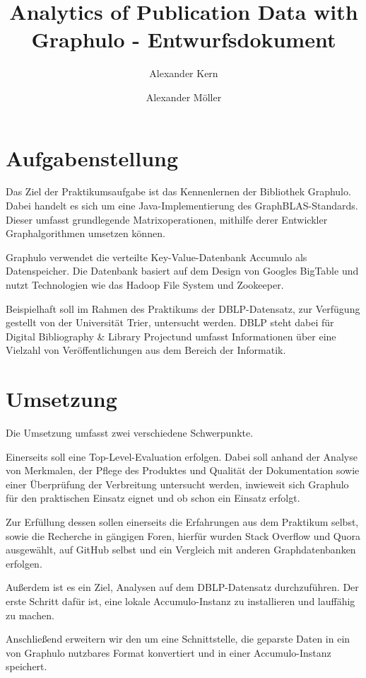 \documentclass{article}
\title{Analytics of Publication Data with Graphulo - Entwurfsdokument}
\author{Alexander Kern \and Alexander Möller}
\begin{document}
\maketitle
	
\section{Aufgabenstellung}

Das Ziel der Praktikumsaufgabe ist das Kennenlernen der Bibliothek Graphulo. Dabei handelt es sich um eine Java-Implementierung des GraphBLAS-Standards. Dieser umfasst grundlegende Matrixoperationen, mithilfe derer Entwickler Graphalgorithmen umsetzen können. \cite{graph}

Graphulo verwendet die verteilte Key-Value-Datenbank Accumulo als Datenspeicher. Die Datenbank basiert auf dem Design von Googles BigTable und nutzt Technologien wie das Hadoop File System und Zookeeper. \cite{acc} 

Beispielhaft soll im Rahmen des Praktikums der DBLP-Datensatz, zur Verfügung gestellt von der Universität Trier, untersucht werden. DBLP steht dabei für \glqq Digital Bibliography \& Library Project\grqq und umfasst Informationen über eine Vielzahl von Veröffentlichungen aus dem Bereich der Informatik. \cite{dblp}


\section{Umsetzung}

Die Umsetzung umfasst zwei verschiedene Schwerpunkte. 

Einerseits soll eine Top-Level-Evaluation erfolgen. Dabei soll anhand der Analyse von Merkmalen, der Pflege des Produktes und Qualität der Dokumentation sowie einer Überprüfung der Verbreitung untersucht werden, inwieweit sich Graphulo für den praktischen Einsatz eignet und ob schon ein Einsatz erfolgt.  

Zur Erfüllung dessen sollen einerseits die Erfahrungen aus dem Praktikum selbst, sowie die Recherche in gängigen Foren, hierfür wurden Stack Overflow und Quora ausgewählt, auf GitHub selbst und ein Vergleich mit anderen Graphdatenbanken erfolgen.

Außerdem ist es ein Ziel, Analysen auf dem DBLP-Datensatz durchzuführen. Der erste Schritt dafür ist, eine lokale Accumulo-Instanz zu installieren und lauffähig zu machen.

Anschließend erweitern wir den \cite{pars} um eine Schnittstelle, die geparste Daten in ein von Graphulo nutzbares Format konvertiert und in einer Accumulo-Instanz speichert.
\end{document}
